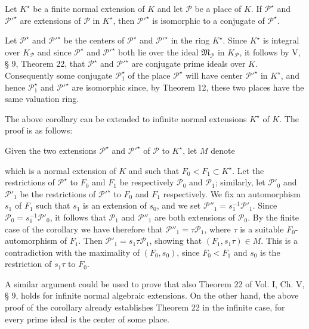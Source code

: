 Let $K^\star$ be a finite normal extension of $K$ and let $\mathcal{P}$ be a place of $K$. If $\mathcal{P}^\star$ and $\mathcal{P}'^\star$ are extensions of $\mathcal{P}$ in $K^\star$, then $\mathcal{P}'^\star$ is isomorphic to a conjugate of $\mathcal{P}^\star$.

Let $\mathcal{P}^\star$ and $\mathcal{P}'^\star$ be the centers of $\mathcal{P}^\star$ and $\mathcal{P}'^\star$ in the ring $K^\star$. Since $K^\star$ is integral over $K_\mathcal{P}$ and since $\mathcal{P}^\star$ and $\mathcal{P}'^\star$ both lie over the ideal $\mathfrak{M}_\mathcal{P}$ in $K_\mathcal{P}$, it follows by V, § 9, Theorem 22, that $\mathcal{P}^\star$ and $\mathcal{P}'^\star$ are conjugate prime ideals over $K$. Consequently some conjugate $\mathcal{P}_1^\star$ of the place $\mathcal{P}^\star$ will have center $\mathcal{P}'^\star$ in $K^\star$, and hence $\mathcal{P}_1^\star$ and $\mathcal{P}'^\star$ are isomorphic since, by Theorem 12, these two places have the same valuation ring.

The above corollary can be extended to infinite normal extensions $K^\star$ of $K$. The proof is as follows:

Given the two extensions $\mathcal{P}^\star$ and $\mathcal{P}'^\star$ of $\mathcal{P}$ to $K^\star$, let $M$ denote

which is a normal extension of $K$ and such that $F_0 < F_1 \subset K^\star$. Let the restrictions of $\mathcal{P}^\star$ to $F_0$ and $F_1$ be respectively $\mathcal{P}_0$ and $\mathcal{P}_1$; similarly, let $\mathcal{P}'_0$ and $\mathcal{P}'_1$ be the restrictions of $\mathcal{P}'^\star$ to $F_0$ and $F_1$ respectively. We fix an automorphism $s_1$ of $F_1$ such that $s_1$ is an extension of $s_0$, and we set $\mathcal{P}''_1 = s_1^{-1}\mathcal{P}'_1$. Since $\mathcal{P}_0 = s_0^{-1}\mathcal{P}'_0$, it follows that $\mathcal{P}_1$ and $\mathcal{P}''_1$ are both extensions of $\mathcal{P}_0$. By the finite case of the corollary we have therefore that $\mathcal{P}''_1 = \tau\mathcal{P}_1$, where $\tau$ is a suitable $F_0$-automorphism of $F_1$. Then $\mathcal{P}'_1 = s_1\tau\mathcal{P}_1$, showing that $(F_1, s_1\tau) \in M$. This is a contradiction with the maximality of $(F_0, s_0)$, since $F_0 < F_1$ and $s_0$ is the restriction of $s_1\tau$ to $F_0$.

A similar argument could be used to prove that also Theorem 22 of Vol. I, Ch. V, § 9, holds for infinite normal algebraic extensions. On the other hand, the above proof of the corollary already establishes Theorem 22 in the infinite case, for every prime ideal is the center of some place.